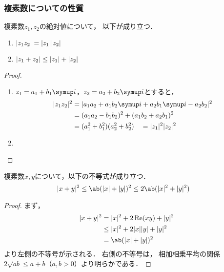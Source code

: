 \documentclass[../sotsu.tex]{subfiles}
\begin{document}
\subsubsection*{複素数についての性質}

\begin{proposition}
    複素数$z_1, z_2$の絶対値について，
    以下が成り立つ．
    \begin{enumerate}
        \item $\lvert z_1 z_2\rvert = \lvert z_1\rvert \lvert z_2\rvert$
        \item $\lvert z_1 + z_2\rvert \leq \lvert z_1\rvert + \lvert z_2\rvert$
    \end{enumerate}
\end{proposition}

\begin{proof}
    \begin{enumerate}
        \item $z_1 = a_1 + b_1 \iu$，$z_2 = a_2 + b_2 \iu$とすると，
            \begin{equation*}
                \begin{split}
                    \abs{z_1 z_2}^2 
                        &= \abs{ a_1 a_2 + a_1 b_2 \iu + a_2 b_1 \iu - a_2 b_2 }^2   \\
                        &= (a_1 a_2 - b_1 b_2)^2 + (a_1 b_2 + a_2 b_1)^2   \\
                        &= (a_1^2 + b_1^2) (a_2^2 + b_2^2)
                        \quad = \abs{z_1}^2 \abs{z_2}^2
                \end{split}
            \end{equation*}
        \item 
    \end{enumerate}
\end{proof}


\begin{proposition}
    複素数$x, y$について，以下の不等式が成り立つ．
    \begin{align}
        \label{eq:complex-abs-squared}
        \abs{x + y}^2 
            &\leq \ab( \abs{x} + \abs{y} )^2 
            \leq 2\ab( \abs{x}^2 + \abs{y}^2 )
    \end{align}
\end{proposition}

\begin{proof}
    まず，
    \begin{equation*}
        \begin{split}
            \abs{x + y}^2
                &= \abs{x}^2 + 2\Re (xy) + \abs{y}^2    \\
                &\leq \abs{x}^2 + 2 \abs{x} \abs{y} + \abs{y}^2  \\
                &= \ab( \abs{x} + \abs{y} )^2
        \end{split}
    \end{equation*}
    より左側の不等号が示される．
    右側の不等号は，
    相加相乗平均の関係$2\sqrt{ab} \leq a + b$（$a, b > 0$）より明らかである．
\end{proof}
\end{document}
